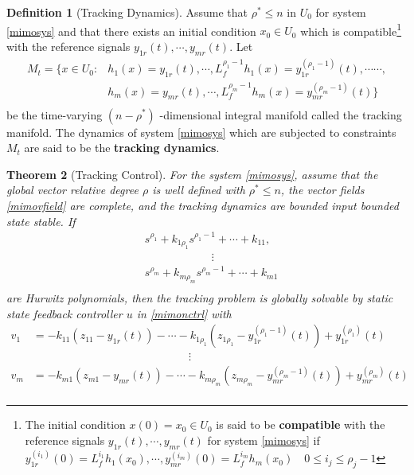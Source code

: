 \documentclass[11pt, a4paper, oneside, openany, reqno]{book}
\newtheorem{theorem}{Theorem}[chapter]
\theoremstyle{definition}
\newtheorem{definition}[theorem]{Definition}
\theoremstyle{remark}
\numberwithin{equation}{chapter} %
\begin{document}
\begin{definition}[Tracking Dynamics]
	Assume that $ \rho^* \leq n $ in $ U_0 $ for system \eqref{mimosys} 
	and that there exists an initial condition $ x_0 \in U_0$ 
	which is compatible\footnote{The initial condition $ x(0)=x_0 \in U_0 $ 
	is said to be \textbf{compatible} with the reference signals 
	$ y_{1r} (t),\cdots,y_{mr} (t) $ for system \eqref{mimosys} 
	if $ y_{1r}^{(i_1)} (0) = L_f^{i_1} h_1(x_0), \cdots, 
	y_{mr}^{(i_m)} (0) = L_f^{i_m} h_m(x_0) \quad 0 \leq i_j \leq \rho_j -1 $} 
	with the reference signals $ y_{1r}(t),\cdots, y_{mr}(t) $. Let \\
	\begin{equation}\begin{split}
	M_t = \lbrace x \in U_0 : &  h_1(x) = y_{1r}(t),\cdots , 
	L_f^{\rho_1-1} h_1 (x) = y_{1r}^{(\rho_1-1)}(t),\cdots\cdots,\\
	& h_m(x) = y_{mr}(t),\cdots , L_f^{\rho_m-1} h_m (x) = y_{mr}^{(\rho_m-1)}(t) \rbrace \\
	\end{split}\end{equation} 
	be the time-varying $ (n-\rho^*) $ -dimensional integral manifold called the tracking manifold. 
	The dynamics of system \eqref{mimosys} which are subjected to constraints $ M_t $ are said to be
	the \textbf{tracking dynamics}.
\end{definition}

\begin{theorem}[Tracking Control]\label{trackingthm}
	For the system \eqref{mimosys}, 
	assume that the global vector relative degree $ \rho $ is well defined with $ \rho^* \leq n $,
	the vector fields \eqref{mimovfield} are complete, 
	and the tracking dynamics are bounded input bounded state stable. If 
	\begin{equation}\begin{split}\label{mimohurwitz}
	&s^{\rho_1} + k_{1\rho_1} s^{\rho_1-1} + \cdots + k_{11}, \\
	&\qquad\qquad\qquad\vdots \\
	&s^{\rho_m} + k_{m\rho_m} s^{\rho_m-1} + \cdots + k_{m1} \\
	\end{split}\end{equation} 
	are Hurwitz polynomials, 
	then the tracking problem is globally solvable 
	by static state feedback controller $ u $ in \eqref{mimonctrl} with 
	\begin{equation}\begin{split}\label{mimov}
	v_1& = -k_{11}(z_{11} - y_{1r} (t)) - \cdots 
	- k_{1\rho_1} (z_{1\rho_1} - y_{1r}^{(\rho_1 -1)}(t)) + y_{1r}^{(\rho_1)} (t) \\
	&\qquad\qquad\qquad\qquad\qquad\qquad\qquad \vdots \\
	v_m& = -k_{m1}(z_{m1} - y_{mr} (t)) - \cdots 
	- k_{m\rho_m} (z_{m\rho_m} - y_{mr}^{(\rho_m -1)}(t)) + y_{mr}^{(\rho_m)} (t) \\
	\end{split}\end{equation} 
\end{theorem}
\end{document}
